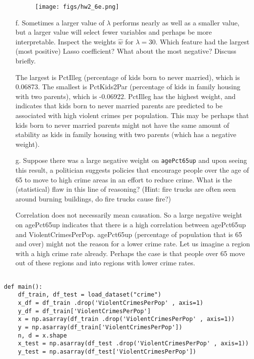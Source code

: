 \documentclass{article}
\begin{document}
\begin{aprob}
\begin{enumerate}
        \begin{figure}[htp] 
        \centering
        \vspace*{-0.1in}
        \texttt{[image: figs/hw2\_6e.png]}
        \label{figs:hw2_6c.png}
        \end{figure}
        
        \item[f.]  Sometimes a larger value of $\lambda$ performs nearly as well as a smaller value, but a larger value will select fewer variables and perhaps be more interpretable.  Inspect the weights $\hat{w}$ for $\lambda = 30$.  Which feature had the largest (most positive) Lasso coefficient? What about the most negative? Discuss briefly.
        
        The largest is PctIlleg (percentage of kids born to never married), which is 0.06873. The smallest is PctKids2Par (percentage of kids in family housing with two parents), which is -0.06922. PctIlleg has the highest weight, and indicates that kids born to never married parents are predicted to be associated with high violent crimes per population. This may be perhaps that kids born to never married parents might not have the same amount of stability as kids in family housing with two parents (which has a negative weight).   
        
        \item[g.]  Suppose there was a large negative weight on \texttt{agePct65up} and upon seeing this result, a politician suggests policies that encourage people over the age of 65 to move to high crime areas in an effort to reduce crime. What is the (statistical) flaw in this line of reasoning? (Hint: fire trucks are often seen around burning buildings, do fire trucks cause fire?)
        
        Correlation does not necessarily mean causation. So a large negative weight on agePct65up indicates that there is a high correlation between agePct65up and ViolentCrimesPerPop. agePct65up (percentage of population that is 65 and over) might not the reason for a lower crime rate. Let us imagine a region with a high crime rate already. Perhaps the case is that people over 65 move out of these regions and into regions with lower crime rates. 
    \end{enumerate}  

\begin{lstlisting}

def main():
    df_train, df_test = load_dataset("crime")
    x_df = df_train .drop('ViolentCrimesPerPop' , axis=1)
    y_df = df_train['ViolentCrimesPerPop']
    x = np.asarray(df_train .drop('ViolentCrimesPerPop' , axis=1))
    y = np.asarray(df_train['ViolentCrimesPerPop'])
    n, d = x.shape
    x_test = np.asarray(df_test .drop('ViolentCrimesPerPop' , axis=1))
    y_test = np.asarray(df_test['ViolentCrimesPerPop'])


\end{lstlisting}
\end{aprob}
\end{document}
